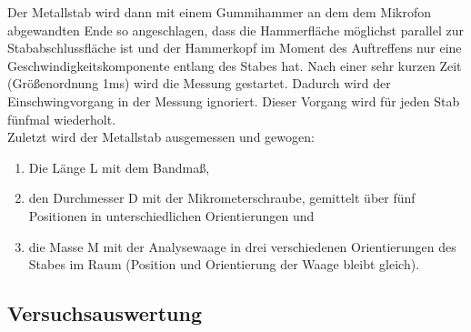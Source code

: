 \documentclass[12pt,a4paper]{article}
\begin{document}
Der Metallstab wird dann mit einem Gummihammer an dem dem Mikrofon abgewandten Ende so angeschlagen, dass die Hammerfläche möglichst parallel zur Stababschlussfläche ist und der Hammerkopf im Moment des Auftreffens nur eine Geschwindigkeitskomponente entlang des Stabes hat. Nach einer sehr kurzen Zeit (Größenordnung 1ms) wird die Messung gestartet. Dadurch wird der Einschwingvorgang in der Messung ignoriert. Dieser Vorgang wird für jeden Stab fünfmal wiederholt. \\

Zuletzt wird der Metallstab ausgemessen und gewogen:
\begin{enumerate}
\item Die Länge L mit dem Bandmaß,
\item den Durchmesser D mit der Mikrometerschraube, gemittelt über fünf Positionen in unterschiedlichen Orientierungen und 
\item die Masse M mit der Analysewaage in drei verschiedenen Orientierungen des Stabes im Raum (Position und Orientierung der Waage bleibt gleich).
\end{enumerate}
\subsection{Versuchsauswertung}
\end{document}
